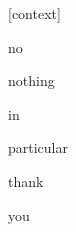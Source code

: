 \documentclass[varwidth]{standalone}
\begin{document}
\begin{CJK*}{UTF8}{gbsn}
{\setlength{\fboxsep}{0pt}\colorbox{white!0}{\parbox{0.9\textwidth}{
\colorbox{red!0.0007207276066765189}{\strut [context]} \colorbox{red!0.0081708375364542}{\strut no} \colorbox{red!28.171184539794922}{\strut nothing} \colorbox{red!1.7466316223144531}{\strut in} \colorbox{red!0.770465075969696}{\strut particular} \colorbox{red!67.5821533203125}{\strut thank} \colorbox{red!1.7206761837005615}{\strut you} 
}}}
\end{CJK*}
\end{document}
